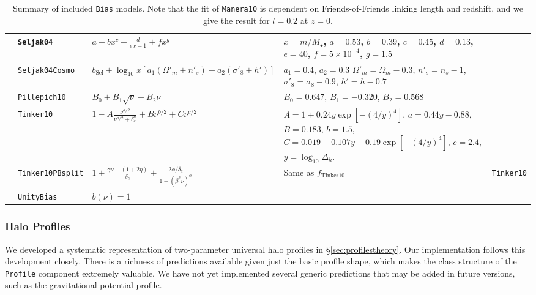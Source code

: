 \documentclass[5p,aas_macros]{elsarticle}
\begin{document}
\begin{table}
\begin{tabular}{>{\raggedright}m{3cm} >{\raggedright}m{2.6cm} >{\raggedright}m{5.2cm} >{\raggedright\arraybackslash}m{4.2cm} >{\raggedright\arraybackslash}m{1.2cm}}
\citet{Seljak2004} & \texttt{Seljak04} & $\displaystyle a + bx^c + \frac{d}{ex+1} + fx^g$ & $x=m/M_\star$, $a=0.53$, $b=0.39$, $c=0.45$, $d=0.13$, $e=40$, $f=5\times10^{-4}$, $g=1.5$ & \\
\midrule
\citet{Seljak2004} & \texttt{Seljak04Cosmo} & $\displaystyle b_\text{Sel} + \log_{10}x \left[a_1(\Omega'_m + n'_s) + a_2(\sigma'_8 + h')\right]$ & $a_1 = 0.4$, $a_2=0.3$ $\Omega'_m=\Omega_m-0.3$, $n'_s = n_s-1$, $\sigma'_8 = \sigma_8-0.9$, $h' = h-0.7$& \\
\midrule
\citet{Pillepich2010} & \texttt{Pillepich10} & $\displaystyle B_0 + B_1\sqrt{\nu} + B_2\nu$ & $B_0=0.647$, $B_1=-0.320$, $B_2=0.568$ & \\
\midrule
 \citet{Tinker2010} & \texttt{Tinker10} & $\displaystyle 1 - A\frac{\nu^{a/2}}{\nu^{a/2} + \delta_c^a} + B\nu^{b/2} + C\nu^{c/2}$ & $A=1+0.24y\exp[-(4/y)^4]$, $a = 0.44 y - 0.88$, $B = 0.183$, $b = 1.5$, $C = 0.019+0.107y+0.19\exp[-(4/y)^4]$, $c = 2.4$, $y=\log_{10}\Delta_h$. &  \\
 \midrule
 \citet{Tinker2010} & \texttt{Tinker10PBsplit} & $\displaystyle 1 + \frac{\gamma\nu-(1+2\eta)}{\delta_c} + \frac{2\phi/\delta_c}{1+(\beta^2\nu)^\phi}$ & Same as $f_\text{Tinker10}$ & \texttt{Tinker10} \\
 \midrule
 & \texttt{UnityBias} & $b(\nu) = 1$ & & \\
 \bottomrule
 \end{tabular}
 \caption[Summary of included \texttt{Bias} models]{Summary of included \texttt{Bias} models. Note that the fit of \texttt{Manera10} is dependent on Friends-of-Friends linking length and redshift, and we give the result for $l = 0.2$ at $z=0$.}
 
\label{tab:models_bias}

\end{table}
\endgroup

\subsubsection{Halo Profiles}
\label{sec:halomod:components:profile}
We developed a systematic representation of two-param\-eter universal halo profiles in \S\ref{sec:profilestheory}. Our implementation follows this development closely. There is a richness of predictions available given just the basic profile shape, which makes the class structure of the \verb|Profile| component extremely valuable. We have not yet implemented several generic predictions that may be added in future versions, such as the gravitational potential profile.
\end{document}
